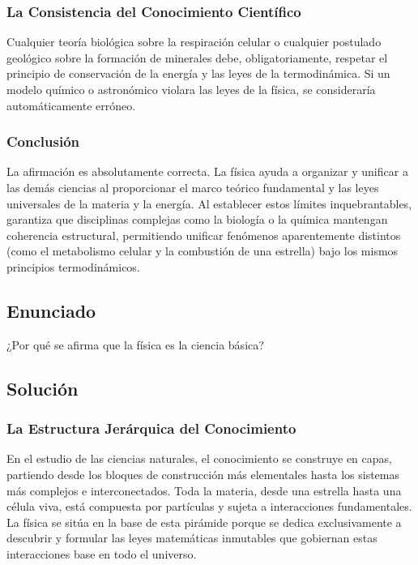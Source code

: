 \documentclass[12pt, a4paper]{article}
\begin{document}
\subsubsection*{La Consistencia del Conocimiento Científico}
Cualquier teoría biológica sobre la respiración celular o cualquier postulado geológico sobre la formación de minerales debe, obligatoriamente, respetar el principio de conservación de la energía y las leyes de la termodinámica. Si un modelo químico o astronómico violara las leyes de la física, se consideraría automáticamente erróneo.

\subsubsection*{Conclusión}
La afirmación es absolutamente correcta. La física ayuda a organizar y unificar a las demás ciencias al proporcionar el marco teórico fundamental y las leyes universales de la materia y la energía. Al establecer estos límites inquebrantables, garantiza que disciplinas complejas como la biología o la química mantengan coherencia estructural, permitiendo unificar fenómenos aparentemente distintos (como el metabolismo celular y la combustión de una estrella) bajo los mismos principios termodinámicos.

\newpage

\subsection*{Enunciado}
¿Por qué se afirma que la física es la ciencia básica?

\subsection*{Solución}

\subsubsection*{La Estructura Jerárquica del Conocimiento}
En el estudio de las ciencias naturales, el conocimiento se construye en capas, partiendo desde los bloques de construcción más elementales hasta los sistemas más complejos e interconectados. Toda la materia, desde una estrella hasta una célula viva, está compuesta por partículas y sujeta a interacciones fundamentales. La física se sitúa en la base de esta pirámide porque se dedica exclusivamente a descubrir y formular las leyes matemáticas inmutables que gobiernan estas interacciones base en todo el universo.
\end{document}
